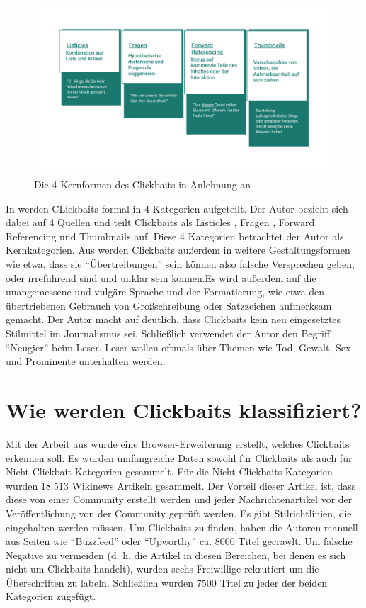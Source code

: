 \begin{figure}[H]
    \centering
    \includegraphics[width=14cm]{kapitel4/clickbaits.png}
    \caption[Die Kernformen des Clickbaits]{Die 4 Kernformen des Clickbaits in Anlehnung an \cite*[71]{Hrsg2020}}
    \label{TSNE}
\end{figure}

In \cite*[70-71]{Hrsg2020} werden CLickbaits formal in 4 Kategorien aufgeteilt. Der Autor bezieht sich dabei auf 4 Quellen und teilt Clickbaits als Listicles \cite*{Vijgen2014}, Fragen \cite*{Lai2014}, Forward Referencing \cite*{Blom2015} und Thumbnails \cite*{Zannettou2018} auf. Diese 4 Kategorien betrachtet der Autor als Kernkategorien. Aus \cite*[71]{Hrsg2020} werden Clickbaits außerdem in weitere Gestaltungsformen wie etwa, dass sie \enquote{Übertreibungen} sein können also falsche Versprechen geben, oder irreführend sind und unklar sein können.Es wird außerdem auf die unangemessene und vulgäre Sprache und der Formatierung, wie etwa den übertriebenen Gebrauch von Großschreibung oder Satzzeichen aufmerksam gemacht. Der Autor macht auf \cite*[75-76]{Hrsg2020} deutlich, dass Clickbaits kein neu eingesetztes Stilmittel im Journalismus sei. Schließlich verwendet der Autor den Begriff \enquote{Neugier} beim Leser. Leser wollen oftmals über Themen wie Tod, Gewalt, Sex und Prominente \cite*{Tenenboim2015} unterhalten werden.




\section{Wie werden Clickbaits klassifiziert?}
Mit der Arbeit aus \cite*{Chakrabortya} wurde eine Browser-Erweiterung erstellt, welches Clickbaits erkennen soll. Es wurden umfangreiche Daten sowohl für Clickbaits als auch für Nicht-Clickbait-Kategorien gesammelt. Für die Nicht-Clickbaits-Kategorien wurden 18.513 Wikinews Artikeln gesammelt. Der Vorteil dieser Artikel ist, dass diese von einer Community erstellt werden und jeder Nachrichtenartikel vor der Veröffentlichung von der Community geprüft werden. Es gibt Stilrichtlinien, die eingehalten werden müssen. Um Clickbaits zu finden, haben die Autoren manuell aus Seiten wie \enquote{Buzzfeed} oder \enquote{Upworthy} ca. 8000 Titel gecrawlt. Um falsche Negative zu vermeiden (d. h. die Artikel in diesen Bereichen, bei denen es sich nicht um Clickbaits handelt), wurden sechs Freiwillige rekrutiert um die Überschriften zu labeln. Schließlich wurden 7500 Titel zu jeder der beiden Kategorien zugefügt.

